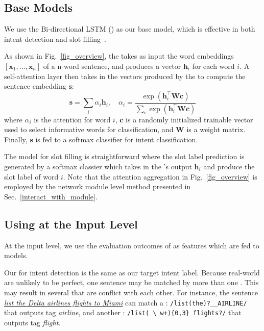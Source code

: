 \subsection{Base Models}
We use the Bi-directional LSTM (\BLSTM) as our base \NN model, which is effective in both intent detection and slot
filling~\cite{liu2016attention}.

 As shown in Fig.~\ref{fig_overview}, the \BLSTM takes as input the word embeddings $[\textbf{x}_1, ...,
\textbf{x}_n]$ of a n-word sentence, and produces a vector $\textbf{h}_i$ for each word $i$. A self-attention layer then takes in the
vectors produced by the \BLSTM to compute the sentence embedding $\textbf{s}$:
\begin{equation}
\textbf{s} = \sum_{i}{\alpha_i\textbf{h}_i}, \quad \alpha_i=\frac{\exp(\textbf{h}_i^\intercal \textbf{Wc})}{\sum_{i}{\exp(\textbf{h}_i^\intercal \textbf{Wc})}}
\label{eq:simple_att}
\end{equation}
where  $\alpha_i$ is the attention for word $i$, $\textbf{c}$ is a randomly initialized trainable vector used to select informative words for classification, and $\textbf{W}$ is a weight matrix.
Finally, $\textbf{s}$ is fed to a softmax classifier for intent classification.

 The model for slot filling is  straightforward where the slot label prediction is generated by a softmax
classier which takes in the \BLSTM's output $\textbf{h}_i$ and produce the slot label of word $i$. Note that the attention
aggregation in Fig.~\ref{fig_overview} is employed by the network module level method presented in Sec.~\ref{interact_with_module}.


\subsection{Using \REs at the Input Level}
\label{fusion_with_input}
At the input level, we use the evaluation outcomes of \REs as features which are fed to \NN models.

Our \REtag for intent detection is the same as our target intent label.
Because real-world \REs are unlikely to be perfect, one sentence may be matched by more than one \RE. This may result in several \REtags
that are conflict with each other. For instance, the sentence \textsl{\underline{list the Delta airlines flights to Miami}} can match a
\RE: {\small \texttt{/list(\;the)?\;\_\_AIRLINE/}} that outputs tag \emph{airline}, and another \RE: {\small \texttt{/list(\,\textbackslash
w+)\{0,3\} flights?/}} that outputs tag \emph{flight}.

